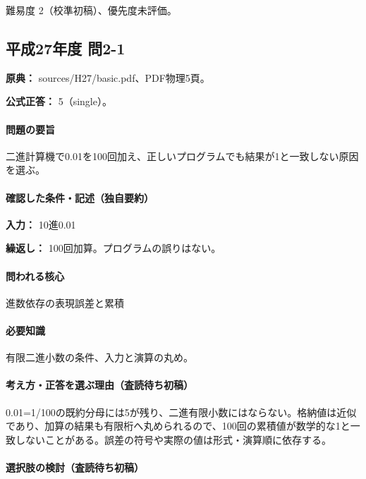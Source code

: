 \par 難易度 2（校準初稿）、優先度未評価。

\subsection{平成27年度 問2-1}
\label{q:h27-reg-basic-2-1}

\noindent\textbf{原典：} sources/H27/basic.pdf、PDF物理5頁。

\textbf{公式正答：} 5（single）。

\paragraph{問題の要旨} 二進計算機で0.01を100回加え、正しいプログラムでも結果が1と一致しない原因を選ぶ。

\paragraph{確認した条件・記述（独自要約）}\mbox{}\par

\noindent\textbf{入力：} 10進0.01\par

\noindent\textbf{繰返し：} 100回加算。プログラムの誤りはない。\par

\paragraph{問われる核心} 進数依存の表現誤差と累積

\paragraph{必要知識} 有限二進小数の条件、入力と演算の丸め。

\paragraph{考え方・正答を選ぶ理由（査読待ち初稿）} 0.01=\allowbreak{}1/100の既約分母には5が残り、二進有限小数にはならない。格納値は近似であり、加算の結果も有限桁へ丸められるので、100回の累積値が数学的な1と一致しないことがある。誤差の符号や実際の値は形式・演算順に依存する。

\paragraph{選択肢の検討（査読待ち初稿）}\mbox{}\par

